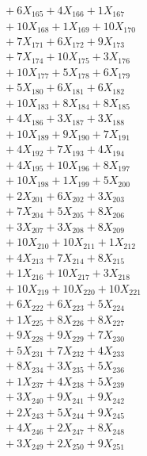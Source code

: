 \documentclass[a4paper,10pt]{article}
\begin{document}
{\begin{align}
&\;  + 6 X_{165} + 4 X_{166} + 1 X_{167} \\[0.5ex]\allowbreak
&\;  + 10 X_{168} + 1 X_{169} + 10 X_{170} \\[0.3ex]
&\;  + 7 X_{171} + 6 X_{172} + 9 X_{173} \\[0.3ex]
&\;  + 7 X_{174} + 10 X_{175} + 3 X_{176} \\[0.3ex]
&\;  + 10 X_{177} + 5 X_{178} + 6 X_{179} \\[0.3ex]
&\;  + 5 X_{180} + 6 X_{181} + 6 X_{182} \\[0.3ex]
&\;  + 10 X_{183} + 8 X_{184} + 8 X_{185} \\[0.3ex]
&\;  + 4 X_{186} + 3 X_{187} + 3 X_{188} \\[0.3ex]
&\;  + 10 X_{189} + 9 X_{190} + 7 X_{191} \\[0.3ex]
&\;  + 4 X_{192} + 7 X_{193} + 4 X_{194} \\[0.3ex]
&\;  + 4 X_{195} + 10 X_{196} + 8 X_{197} \\[0.5ex]\allowbreak
&\;  + 10 X_{198} + 1 X_{199} + 5 X_{200} \\[0.3ex]
&\;  + 2 X_{201} + 6 X_{202} + 3 X_{203} \\[0.3ex]
&\;  + 7 X_{204} + 5 X_{205} + 8 X_{206} \\[0.3ex]
&\;  + 3 X_{207} + 3 X_{208} + 8 X_{209} \\[0.3ex]
&\;  + 10 X_{210} + 10 X_{211} + 1 X_{212} \\[0.3ex]
&\;  + 4 X_{213} + 7 X_{214} + 8 X_{215} \\[0.3ex]
&\;  + 1 X_{216} + 10 X_{217} + 3 X_{218} \\[0.3ex]
&\;  + 10 X_{219} + 10 X_{220} + 10 X_{221} \\[0.3ex]
&\;  + 6 X_{222} + 6 X_{223} + 5 X_{224} \\[0.3ex]
&\;  + 1 X_{225} + 8 X_{226} + 8 X_{227} \\[0.5ex]\allowbreak
&\;  + 9 X_{228} + 9 X_{229} + 7 X_{230} \\[0.3ex]
&\;  + 5 X_{231} + 7 X_{232} + 4 X_{233} \\[0.3ex]
&\;  + 8 X_{234} + 3 X_{235} + 5 X_{236} \\[0.3ex]
&\;  + 1 X_{237} + 4 X_{238} + 5 X_{239} \\[0.3ex]
&\;  + 3 X_{240} + 9 X_{241} + 9 X_{242} \\[0.3ex]
&\;  + 2 X_{243} + 5 X_{244} + 9 X_{245} \\[0.3ex]
&\;  + 4 X_{246} + 2 X_{247} + 8 X_{248} \\[0.3ex]
&\;  + 3 X_{249} + 2 X_{250} + 9 X_{251}\nonumber
\end{align}
}
\end{document}
